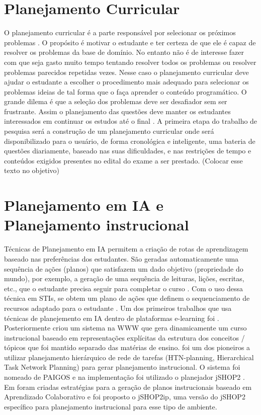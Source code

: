 \documentclass[
12pt,				%
oneside,			%
a4paper,			%
english,			%
brazil				%
]{abntex2ppgsi}
\begin{document}
\section{Planejamento Curricular}

O planejamento curricular  é a parte responsável por selecionar os próximos problemas \cite{cho1999}. O propósito é motivar o estudante e ter certeza de que ele é capaz de resolver os problemas da base de domínio. No entanto não é de interesse fazer com que seja gasto muito tempo tentando resolver todos os problemas ou resolver problemas parecidos repetidas vezes. Nesse caso o planejamento curricular deve ajudar o estudante a escolher o procedimento mais adequado para selecionar os problemas ideias de tal forma que o faça aprender o conteúdo programático. O grande dilema é que a seleção dos problemas deve ser desafiador sem ser frustrante. Assim o planejamento das questões deve manter os estudantes interessados em continuar os estudos até o final \cite{cho2000}.
A primeira etapa do trabalho de pesquisa será a construção de um planejamento curricular onde será disponibilizado para o usuário, de forma cronológica e inteligente, uma bateria de questões diariamente, baseado nas suas dificuldades, e nas restrições de tempo e conteúdos exigidos presentes no edital do exame a ser prestado. (Colocar esse texto no objetivo)

\section{Planejamento em IA e Planejamento instrucional}

Técnicas de Planejamento em IA permitem a criação de rotas de aprendizagem baseado nas preferências dos estudantes. São geradas automaticamente uma sequência de ações (planos) que satisfazem um dado objetivo (propriedade do mundo), por exemplo, a geração de uma sequência de leituras, lições, escritas, etc., que o estudante precisa seguir para completar o curso \cite{castillo2010}. Com o uso dessa técnica em STIs, se obtem um plano de ações que definem o sequenciamento de recursos adaptado para o estudante \cite{challco2012}.
Um dos primeiros trabalhos que usa técnicas de planejemento em IA dentro de plataformas e-learning foi \cite{peachey1986}. Posteriormente  criou um sistema na WWW que gera dinamicamente um curso instrucional baseado em representações explícitas da estrutura dos conceitos / tópicos que foi mantido separado das matérias de ensino.  foi um dos pioneiros a utilizar planejamento hierárquico de rede de tarefas (HTN-planning, Hierarchical Task Network Planning) para gerar planejamento instrucional. O sistema foi nomeado de PAIGOS e na implementação foi utilizado o planejador jSHOP2 \cite{nau2003}. Em  foram criadas estratégias para a geração de planos instrucionais baseado em Aprendizado Colaborativo e foi proposto o jSHOP2ip, uma versão do jSHOP2 específico para planejamento instrucional para esse tipo de ambiente.
\end{document}
